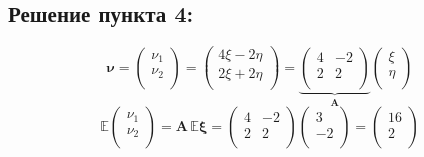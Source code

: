 \documentclass[12pt]{spbstu-task}
\begin{document}
\subsection*{Решение пункта 4:}
\begin{displaymath}
  \boldsymbol{\nu} = \begin{pmatrix}
    \nu_1 \\
    \nu_2 \\
  \end{pmatrix} = \begin{pmatrix}
    4\xi - 2\eta \\
    2\xi + 2\eta \\
  \end{pmatrix} = \underbrace{\begin{pmatrix}
    4 & -2 \\
    2 & 2 \\
  \end{pmatrix}}_{\mathbf{A}}\begin{pmatrix}
    \xi \\
    \eta \\
  \end{pmatrix}
\end{displaymath}
\begin{displaymath}
  \mathbb{E}\begin{pmatrix}
    \nu_1 \\
    \nu_2 \\
  \end{pmatrix} = \mathbf{A}\,\mathbb{E}\boldsymbol{\xi} = \begin{pmatrix}
    4 & -2 \\
    2 & 2 \\
  \end{pmatrix}\begin{pmatrix}
    3 \\
    -2 \\
  \end{pmatrix} = \begin{pmatrix}
    16 \\
    2 \\
  \end{pmatrix}
\end{displaymath}
\end{document}
